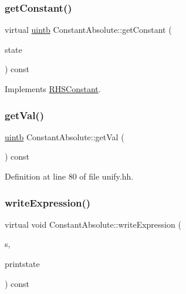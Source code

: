 \subsubsection{\texorpdfstring{getConstant()}{getConstant()}}
{\footnotesize\ttfamily virtual \mbox{\hyperlink{types_8h_a2db313c5d32a12b01d26ac9b3bca178f}{uintb}} Constant\+Absolute\+::get\+Constant (\begin{DoxyParamCaption}\item[{\mbox{\hyperlink{class_unify_state}{Unify\+State}} \&}]{state }\end{DoxyParamCaption}) const\hspace{0.3cm}{\ttfamily [virtual]}}



Implements \mbox{\hyperlink{class_r_h_s_constant_a941b5d2898cbce985a3ef9c5db6fa458}{R\+H\+S\+Constant}}.

\mbox{\label{class_constant_absolute_a426b1b76e07a9142110884947c20ff5c}} 
\subsubsection{\texorpdfstring{getVal()}{getVal()}}
{\footnotesize\ttfamily \mbox{\hyperlink{types_8h_a2db313c5d32a12b01d26ac9b3bca178f}{uintb}} Constant\+Absolute\+::get\+Val (\begin{DoxyParamCaption}\item[{void}]{ }\end{DoxyParamCaption}) const\hspace{0.3cm}{\ttfamily [inline]}}



Definition at line 80 of file unify.\+hh.

\mbox{\label{class_constant_absolute_a137b56bbc65f682cefb1b997dd993dc8}} 
\subsubsection{\texorpdfstring{writeExpression()}{writeExpression()}}
{\footnotesize\ttfamily virtual void Constant\+Absolute\+::write\+Expression (\begin{DoxyParamCaption}\item[{ostream \&}]{s,  }\item[{\mbox{\hyperlink{class_unify_c_printer}{Unify\+C\+Printer}} \&}]{printstate }\end{DoxyParamCaption}) const\hspace{0.3cm}{\ttfamily [virtual]}}



